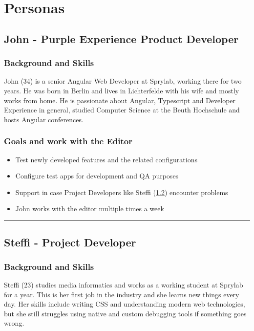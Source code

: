 
\chapter{Personas}
\label{app:personas}


\section{John - Purple Experience Product Developer}
\label{persona:productdev}
\subsection{Background and Skills}
John (34) is a senior Angular Web Developer at Sprylab, working there for two years. He was born in Berlin and lives in Lichterfelde with his wife and mostly works from home. He is passionate about Angular, Typescript and Developer Experience in general, studied Computer Science at the Beuth Hochschule and hosts Angular conferences.
\\
\subsection{Goals and work with the Editor}
\begin{itemize}[itemsep=0mm]
  \item Test newly developed features and the related configurations
  \item Configure test apps for development and QA purposes
  \item Support in case Project Developers like Steffi (\ref{persona:projectdev}) encounter problems
  \item John works with the editor multiple times a week
\end{itemize}

\hrule
\section{Steffi - Project Developer}
\label{persona:projectdev}
\subsection{Background and Skills}
Steffi (23) studies media informatics and works as a working student at Sprylab for a year. This is her first job in the industry and she learns new things every day. Her skills include writing CSS and understanding modern web technologies, but she still struggles using native and custom debugging tools if something goes wrong.  
\\
